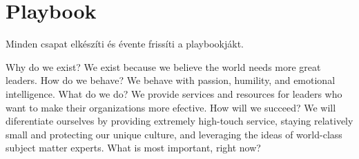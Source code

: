\section{Playbook}
Minden csapat elkészíti és évente frissíti a playbookjákt.

Why do we exist? We exist because we believe the world needs more great leaders. How do we behave? We behave with passion, humility, and emotional intelligence. What do we do? We provide services and resources for leaders who want to make their organizations more efective. How will we succeed? We will diferentiate ourselves by providing extremely high-touch service, staying relatively small and protecting our unique culture, and leveraging the ideas of world-class subject matter experts. What is most important, right now?